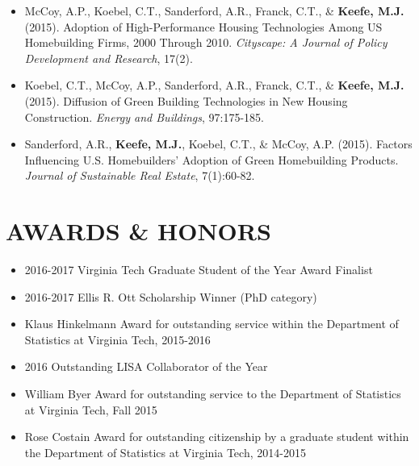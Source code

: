 \documentclass[10pt]{article}
\begin{document}
\begin{itemize}
\item[] McCoy, A.P., Koebel, C.T., Sanderford, A.R., Franck, C.T., \& \textbf{Keefe, M.J.} (2015). Adoption of High-Performance Housing Technologies Among US Homebuilding Firms, 2000 Through 2010. \textit{Cityscape: A Journal of Policy Development and Research}, 17(2).

\item[] Koebel, C.T., McCoy, A.P., Sanderford, A.R., Franck, C.T., \& \textbf{Keefe, M.J.} (2015). Diffusion of Green Building Technologies in New Housing Construction. \textit{Energy and Buildings}, 97:175-185.

\item[] Sanderford, A.R., \textbf{Keefe, M.J.}, Koebel, C.T., \& McCoy, A.P. (2015). Factors Influencing U.S. Homebuilders' Adoption of Green Homebuilding Products. \textit{Journal of Sustainable Real Estate}, 7(1):60-82.

\end{itemize}

\section*{AWARDS \& HONORS}
\begin{itemize}
\item 2016-2017 Virginia Tech Graduate Student of the Year Award Finalist
\item 2016-2017 Ellis R. Ott Scholarship Winner (PhD category)
\item Klaus Hinkelmann Award for outstanding service within the Department of Statistics at Virginia Tech, 2015-2016
\item 2016 Outstanding LISA Collaborator of the Year
\item William Byer Award for outstanding service to the Department of Statistics at Virginia Tech, Fall 2015
\item Rose Costain Award for outstanding citizenship by a graduate student within the Department of Statistics at Virginia Tech, 2014-2015

\end{itemize}
\end{document}
